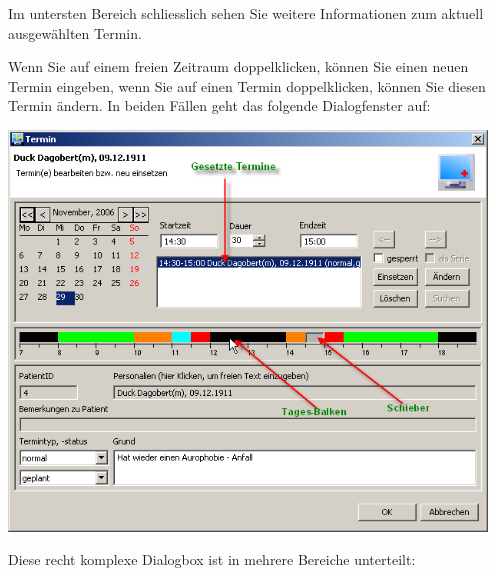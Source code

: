 Im untersten Bereich schliesslich sehen Sie weitere Informationen zum aktuell ausgewählten Termin.

Wenn Sie auf einem freien Zeitraum doppelklicken, können Sie einen neuen Termin eingeben, wenn Sie auf einen Termin doppelklicken,
können Sie diesen Termin ändern. In beiden Fällen geht das folgende Dialogfenster auf:



\includegraphics[width=5in]{images/use4.png}

Diese recht komplexe Dialogbox ist in mehrere Bereiche unterteilt:

